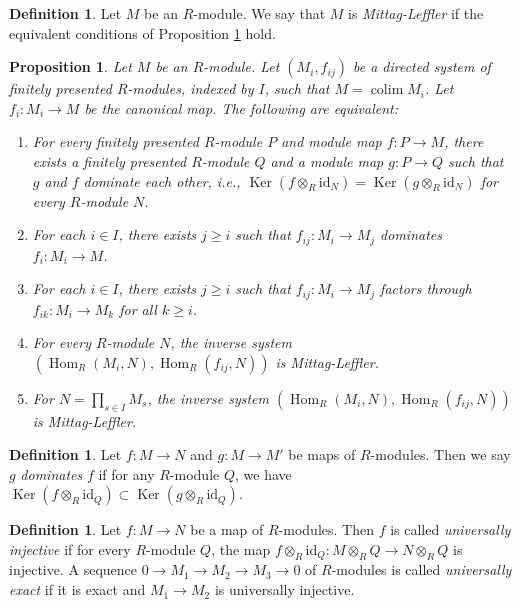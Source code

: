 \documentclass{amsart}
\theoremstyle{plain}
\newtheorem{proposition}[subsection]{Proposition}
\theoremstyle{definition}
\newtheorem{definition}[subsection]{Definition}
\theoremstyle{remark}
\numberwithin{equation}{subsection}
\def\colim{\mathop{\mathrm{colim}}\nolimits}
\def\Hom{\mathop{\mathrm{Hom}}\nolimits}
\def\Ker{\mathop{\mathrm{Ker}}}
\begin{document}
\begin{definition}
\label{algebra-definition-mittag-leffler-module}
Let $M$ be an $R$-module.  We say that $M$ is {\it Mittag-Leffler} if the
equivalent conditions of
Proposition \ref{algebra-proposition-ML-characterization}
hold.
\end{definition}

\begin{proposition}
\label{algebra-proposition-ML-characterization}
Let $M$ be an $R$-module.  Let $(M_i, f_{ij})$ be a directed system of finitely
presented $R$-modules, indexed by $I$, such that $M = \colim M_i$.  Let
$f_i:
M_i \to M$ be the canonical map.  The following are equivalent:
\begin{enumerate}
\item For every finitely presented $R$-module $P$ and module map $f: P
\to M$, there exists a finitely presented $R$-module $Q$ and a module
map $g: P \to Q$ such that $g$ and $f$ dominate each other, i.e.,
$\Ker(f \otimes_R \text{id}_N) = \Ker(g \otimes_R \text{id}_N)$
for every $R$-module $N$.
\item For each $i \in I$, there exists $j \geq i$ such that $f_{ij}: M_i
\to M_j$ dominates $f_i: M_i \to M$.
\item For each $i \in I$, there exists $j \geq i$ such that $f_{ij}: M_i
\to M_j$ factors through $f_{ik}: M_i \to M_k$ for all $k \geq
i$.
\item For every $R$-module $N$, the inverse system
$(\Hom_R(M_i, N), \Hom_R(f_{ij}, N))$ is Mittag-Leffler.
\item For $N = \prod_{s \in I} M_s$, the inverse system
$(\Hom_R(M_i, N), \Hom_R(f_{ij}, N))$ is Mittag-Leffler.
\end{enumerate}
\end{proposition}

\begin{definition}
\label{algebra-definition-domination}
Let $f: M \to N$ and $g: M \to M'$ be maps of $R$-modules.
Then we say $g$ {\it dominates} $f$ if for any $R$-module $Q$, we have $\Ker(f
\otimes_R \text{id}_Q) \subset \Ker(g \otimes_R \text{id}_Q)$.
\end{definition}

\begin{definition}
\label{algebra-definition-universally-injective}
Let $f: M \to N$ be a map of $R$-modules.  Then $f$ is called
{\it universally injective} if for every $R$-module $Q$, the map $f
\otimes_R \text{id}_Q: M \otimes_R Q \to N \otimes_R Q$
is injective.  A sequence $0 \to M_1 \to M_2 \to M_3
\to 0$ of $R$-modules is called {\it universally exact} if it is exact
and $M_1 \to M_2$ is universally injective.
\end{definition}
\end{document}
